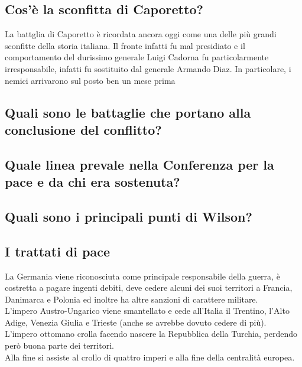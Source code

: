 \documentclass{article}
\begin{document}
\subsection{Cos'è la sconfitta di Caporetto?}
La battglia di Caporetto è ricordata ancora oggi come una delle più grandi sconfitte della storia italiana. Il fronte infatti
fu mal presidiato e il comportamento del durissimo generale Luigi Cadorna fu particolarmente irresponsabile, infatti fu
sostituito dal generale Armando Diaz. In particolare, i nemici arrivarono sul posto ben un mese prima

\subsection{Quali sono le battaglie che portano alla conclusione del conflitto?}

\subsection{Quale linea prevale nella Conferenza per la pace e da chi era sostenuta?}

\subsection{Quali sono i principali punti di Wilson?}

\subsection{I trattati di pace}
La Germania viene riconosciuta come principale responsabile della guerra, è costretta a pagare ingenti debiti, deve cedere
alcuni dei suoi territori a Francia, Danimarca e Polonia ed inoltre ha altre sanzioni di carattere militare.\\
L'impero Austro-Ungarico viene smantellato e cede all'Italia il Trentino, l'Alto Adige, Venezia Giulia e Trieste (anche se
avrebbe dovuto cedere di più).\\
L'impero ottomano crolla facendo nascere la Repubblica della Turchia, perdendo però buona parte dei territori.\\
Alla fine si assiste al crollo di quattro imperi e alla fine della centralità europea.
\end{document}
